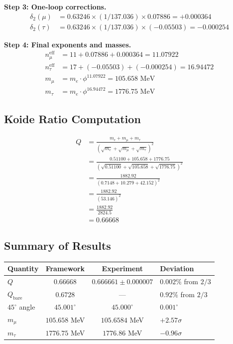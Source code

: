\documentclass[12pt,a4paper]{article}
\theoremstyle{definition}
\begin{document}
\textbf{Step 3: One-loop corrections.}
\begin{align}
\delta_2(\mu) &= 0.63246 \times (1/137.036) \times 0.07886 = +0.000364 \\
\delta_2(\tau) &= 0.63246 \times (1/137.036) \times (-0.05503) = -0.000254
\end{align}

\textbf{Step 4: Final exponents and masses.}
\begin{align}
n_\mu^{\mathrm{eff}} &= 11 + 0.07886 + 0.000364 = 11.07922 \\
n_\tau^{\mathrm{eff}} &= 17 + (-0.05503) + (-0.000254) = 16.94472 \\
m_\mu &= m_e \cdot \phi^{11.07922} = 105.658\text{ MeV} \\
m_\tau &= m_e \cdot \phi^{16.94472} = 1776.75\text{ MeV}
\end{align}

\subsection{Koide Ratio Computation}

\begin{align}
Q &= \frac{m_e + m_\mu + m_\tau}{(\sqrt{m_e} + \sqrt{m_\mu} + \sqrt{m_\tau})^2} \\
  &= \frac{0.51100 + 105.658 + 1776.75}{(\sqrt{0.51100} + \sqrt{105.658} + \sqrt{1776.75})^2} \\
  &= \frac{1882.92}{(0.7148 + 10.279 + 42.152)^2} \\
  &= \frac{1882.92}{(53.146)^2} \\
  &= \frac{1882.92}{2824.5} \\
  &= 0.66668
\end{align}

\subsection{Summary of Results}

\begin{center}
\begin{tabular}{lccl}
\toprule
\textbf{Quantity} & \textbf{Framework} & \textbf{Experiment} & \textbf{Deviation} \\
\midrule
$Q$ & $0.66668$ & $0.666661 \pm 0.000007$ & $0.002\%$ from $2/3$ \\
$Q_{\mathrm{bare}}$ & $0.6728$ & --- & $0.92\%$ from $2/3$ \\
$45^\circ$ angle & $45.001^\circ$ & $45.000^\circ$ & $0.001^\circ$ \\
$m_\mu$ & $105.658$ MeV & $105.6584$ MeV & $+2.57\sigma$ \\
$m_\tau$ & $1776.75$ MeV & $1776.86$ MeV & $-0.96\sigma$ \\
\bottomrule
\end{tabular}
\end{center}
\end{document}
